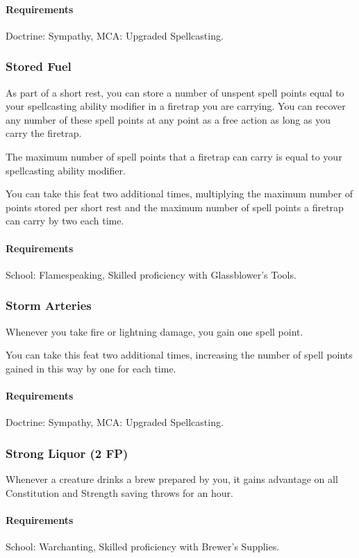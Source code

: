     \paragraph{Requirements} Doctrine: Sympathy, MCA: Upgraded Spellcasting.
\subsubsection{Stored Fuel} \label{feat::storedfuel}
    As part of a short rest, you can store a number of unspent spell points equal to your spellcasting ability modifier in a firetrap you are carrying.
    You can recover any number of these spell points at any point as a free action as long as you carry the firetrap.

    The maximum number of spell points that a firetrap can carry is equal to your spellcasting ability modifier.

    You can take this feat two additional times, multiplying the maximum number of points stored per short rest and the maximum number of spell points a firetrap can carry by two each time.
    \paragraph{Requirements} School: Flamespeaking, Skilled proficiency with Glassblower's Tools.
\subsubsection{Storm Arteries} \label{feat::stormarteries}
    Whenever you take fire or lightning damage, you gain one spell point.

    You can take this feat two additional times, increasing the number of spell points gained in this way by one for each time.
    \paragraph{Requirements} Doctrine: Sympathy, MCA: Upgraded Spellcasting.
\subsubsection{Strong Liquor (2 FP)} \label{feat::strongliquor}
    Whenever a creature drinks a brew prepared by you, it gains advantage on all Constitution and Strength saving throws for an hour.
    \paragraph{Requirements} School: Warchanting, Skilled proficiency with Brewer's Supplies.
